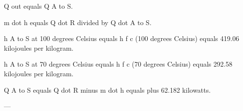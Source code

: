 Q out equals Q A to S.  

m dot h equals Q dot R divided by Q dot A to S.  

h A to S at 100 degrees Celsius equals h f c (100 degrees Celsius) equals 419.06 kilojoules per kilogram.  

h A to S at 70 degrees Celsius equals h f c (70 degrees Celsius) equals 292.58 kilojoules per kilogram.  

Q A to S equals Q dot R minus m dot h equals plus 62.182 kilowatts.  

---